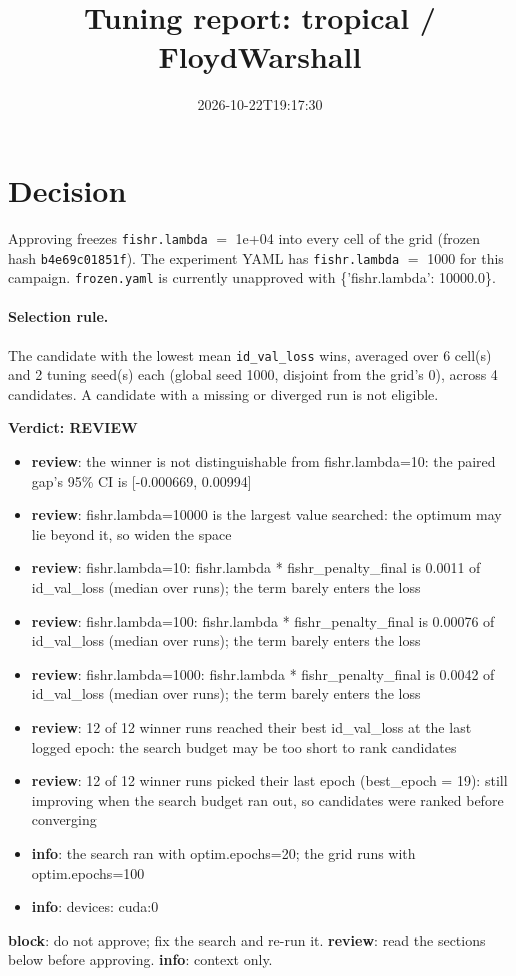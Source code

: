 \documentclass[10pt]{article}
\title{Tuning report: tropical / FloydWarshall}
\date{2026-10-22T19:17:30}
\begin{document}
\maketitle

\section{Decision}
Approving freezes
\texttt{fishr.lambda} $=$ 1e+04 into every cell of the grid (frozen hash \texttt{b4e69c01851f}).
The experiment YAML has
\texttt{fishr.lambda} $=$ 1000 for this campaign.
\texttt{frozen.yaml} is currently unapproved with \{'fishr.lambda': 10000.0\}.

\paragraph{Selection rule.} The candidate with the lowest mean \texttt{id\_val\_loss} wins, averaged over 6 cell(s) and 2 tuning seed(s) each (global seed 1000, disjoint from the grid's 0), across 4 candidates. A candidate with a missing or diverged run is not eligible.

\begin{framed}
\noindent\textbf{Verdict: \textcolor{orange!85!black}{REVIEW}}
\begin{itemize}\setlength\itemsep{0pt}
\item \textbf{review}: the winner is not distinguishable from fishr.lambda=10: the paired gap's 95\% CI is [-0.000669, 0.00994]
\item \textbf{review}: fishr.lambda=10000 is the largest value searched: the optimum may lie beyond it, so widen the space
\item \textbf{review}: fishr.lambda=10: fishr.lambda * fishr\_penalty\_final is 0.0011 of id\_val\_loss (median over runs); the term barely enters the loss
\item \textbf{review}: fishr.lambda=100: fishr.lambda * fishr\_penalty\_final is 0.00076 of id\_val\_loss (median over runs); the term barely enters the loss
\item \textbf{review}: fishr.lambda=1000: fishr.lambda * fishr\_penalty\_final is 0.0042 of id\_val\_loss (median over runs); the term barely enters the loss
\item \textbf{review}: 12 of 12 winner runs reached their best id\_val\_loss at the last logged epoch: the search budget may be too short to rank candidates
\item \textbf{review}: 12 of 12 winner runs picked their last epoch (best\_epoch = 19): still improving when the search budget ran out, so candidates were ranked before converging
\item \textbf{info}: the search ran with optim.epochs=20; the grid runs with optim.epochs=100
\item \textbf{info}: devices: cuda:0
\end{itemize}
\end{framed}
\noindent\textbf{block}: do not approve; fix the search and re-run it. \textbf{review}: read the sections below before approving. \textbf{info}: context only.
\end{document}
